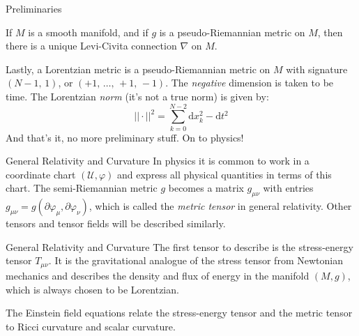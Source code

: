 \documentclass{beamer}
\begin{document}
    \begin{frame}{Preliminaries}
        \begin{theorem}
            If $M$ is a smooth manifold, and if $g$ is a pseudo-Riemannian
            metric on $M$, then there is a unique Levi-Civita connection
            $\nabla$ on $M$.
        \end{theorem}
        Lastly, a Lorentzian metric is a pseudo-Riemannian metric on $M$
        with signature $(N-1,\,1)$, or $(+1,\,\dots,\,+1,\,-1)$. The
        \textit{negative} dimension is taken to be time. The Lorentzian
        \textit{norm} (it's not a true norm) is given by:
        \begin{equation}
            ||\cdot||^{2}=\sum_{k=0}^{N-2}\textrm{d}x_{k}^{2}-\textrm{d}t^{2}
        \end{equation}
        And that's it, no more preliminary stuff. On to physics!
    \end{frame}
    \begin{frame}{General Relativity and Curvature}
        In physics it is common to work in a coordinate chart
        $(\mathcal{U},\varphi)$ and express all physical quantities in terms of
        this chart. The semi-Riemannian metric $g$ becomes a matrix
        $g_{\mu\nu}$ with entries
        $g_{\mu\nu}=g(\partial\varphi_{\mu},\partial\varphi_{\nu})$, which is
        called the \textit{metric tensor} in general relativity. Other tensors
        and tensor fields will be described similarly.
    \end{frame}
    \begin{frame}{General Relativity and Curvature}
        The first tensor to describe is the stress-energy tensor $T_{\mu\nu}$.
        It is the gravitational analogue of the stress tensor from Newtonian
        mechanics and describes the density and flux of energy in the
        manifold $(M,g)$, which is always chosen to be Lorentzian.
        \par\hfill\par
        The Einstein field equations relate the stress-energy tensor and the
        metric tensor to Ricci curvature and scalar curvature.
    \end{frame}
\end{document}
